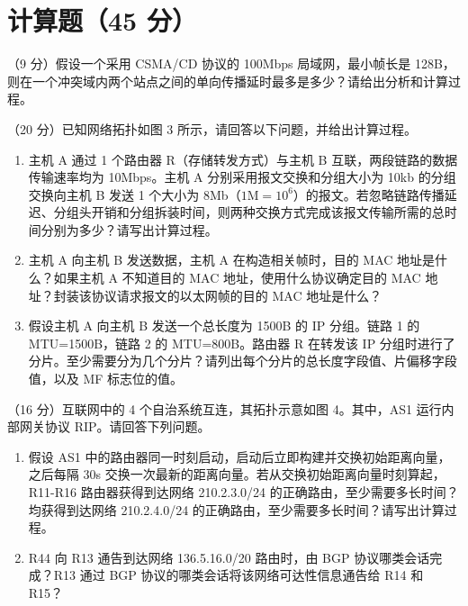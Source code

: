 \section{计算题（45 分）}
\begin{question}[index=1]
（9 分）假设一个采用 CSMA/CD 协议的 100Mbps 局域网，最小帧长是 128B，则在一个冲突域内两个站点之间的单向传播延时最多是多少？请给出分析和计算过程。
\end{question}
\begin{question}[index=2]
（20 分）已知网络拓扑如图 3 所示，请回答以下问题，并给出计算过程。
\par\smallskip\noindent\makebox[\linewidth][c]{}
\par\noindent{}
\begin{enumerate}[label=\alph*)]
\item 主机 A 通过 1 个路由器 R（存储转发方式）与主机 B 互联，两段链路的数据传输速率均为 10Mbps。主机 A 分别采用报文交换和分组大小为 10kb 的分组交换向主机 B 发送 1 个大小为 8Mb（$1\mathrm{M}=10^6$）的报文。若忽略链路传播延迟、分组头开销和分组拆装时间，则两种交换方式完成该报文传输所需的总时间分别为多少？请写出计算过程。
\item 主机 A 向主机 B 发送数据，主机 A 在构造相关帧时，目的 MAC 地址是什么？如果主机 A 不知道目的 MAC 地址，使用什么协议确定目的 MAC 地址？封装该协议请求报文的以太网帧的目的 MAC 地址是什么？
\item 假设主机 A 向主机 B 发送一个总长度为 1500B 的 IP 分组。链路 1 的 MTU=1500B，链路 2 的 MTU=800B。路由器 R 在转发该 IP 分组时进行了分片。至少需要分为几个分片？请列出每个分片的总长度字段值、片偏移字段值，以及 MF 标志位的值。
\end{enumerate}
\end{question}
\newpage
\begin{question}[index=3]
（16 分）互联网中的 4 个自治系统互连，其拓扑示意如图 4。其中，AS1 运行内部网关协议 RIP。请回答下列问题。
\begin{enumerate}[label=（\arabic*）]
\item 假设 AS1 中的路由器同一时刻启动，启动后立即构建并交换初始距离向量，之后每隔 30s 交换一次最新的距离向量。若从交换初始距离向量时刻算起，R11-R16 路由器获得到达网络 210.2.3.0/24 的正确路由，至少需要多长时间？均获得到达网络 210.2.4.0/24 的正确路由，至少需要多长时间？请写出计算过程。
\item R44 向 R13 通告到达网络 136.5.16.0/20 路由时，由 BGP 协议哪类会话完成？R13 通过 BGP 协议的哪类会话将该网络可达性信息通告给 R14 和 R15？
\end{enumerate}
\par\smallskip\noindent\makebox[\linewidth][c]{}
\par\noindent{}
\end{question}
